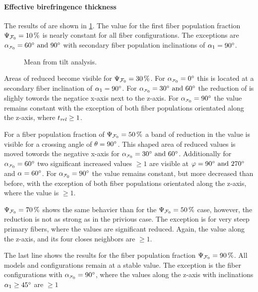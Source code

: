 \paragraph{Effective birefringence thickness \trel{}}
% 
The results of \trel{} are shown in \cref{fig:sim_ana_trel}.
The \trel{} value for the first fiber population fraction $\textnormal{$\Psi_{\textnormal{$\mathcal{F}_0$}}$}=\SI{10}{\percent}$ 
is nearly constant for all fiber configurations.
The exceptions are $\modelInc=\SIlist{60;90}{\degree}$ with secondary fiber population inclinations of $\textnormal{$\alpha$}_1 = \SI{90}{\degree}$.
\par
%
\begin{figure}[!p]
    \centering
    \tikzset{external/export next=false}
    \caption{Mean \trel{} from tilt analysis.}
    \label{fig:sim_ana_trel}
\end{figure}
% 
Areas of reduced \trel{} become visible for $\textnormal{$\Psi_{\textnormal{$\mathcal{F}_0$}}$}=\SI{30}{\percent}$.
For $\modelInc=\SI{0}{\degree}$ this is located at a secondary fiber inclination of $\textnormal{$\alpha$}_1 = \SI{90}{\degree}$.
For $\modelInc=\SIlist[]{30;60}{\degree}$ the reduction of \trel{} is slighly towords the negatice x-axis next to the z-axis.
For $\modelInc=\SI{90}{\degree}$ the \trel{} value remains constant with the exception of both fiber populations orientated along the z-axis, where $\textnormal{$t_\mathit{rel}$} \geq 1$.
\par
% 
For a fiber population fraction of $\textnormal{$\Psi_{\textnormal{$\mathcal{F}_0$}}$}=\SI{50}{\percent}$ a band of reduction in the \trel{} value is visible for a crossing angle of $\textnormal{$\theta$}=\SI{90}{\degree}$.
This  shaped area of reduced \trel{} values is moved towords the negative x-axis for $\modelInc=\SIlist{30;60}{\degree}$.
Additionally for $\modelInc=\SI{60}{\degree}$ two significant increased \trel{} values $\geq 1$ are visible at $\dir=\SIlist{90;270}{\degree}$ and $\textnormal{$\alpha$}=\SI{60}{\degree}$.
For $\modelInc=\SI{90}{\degree}$ the \trel{} value remains constant, but more decreased than before, with the exception of both fiber populations orientated along the z-axis, where the \trel{} value is $\geq 1$.
\par
% 
$\textnormal{$\Psi_{\textnormal{$\mathcal{F}_0$}}$}=\SI{70}{\percent}$ shows the same behavier than for the $\textnormal{$\Psi_{\textnormal{$\mathcal{F}_0$}}$}=\SI{50}{\percent}$ case, however, the reduction is not as strong as in the privious case.
The exception is for very steep primary fibers, where the \trel{} values are significant reduced.
Again, the \trel{} value along the z-axis, and its four closes neighbors are $\geq 1$. 
\par
% 
The last line shows the results for the fiber population fraction $\textnormal{$\Psi_{\textnormal{$\mathcal{F}_0$}}$}=\SI{90}{\percent}$.
All models and configurations remain at a stable \trel{} value.
The exception is the fiber configurations with $\modelInc=\SI{90}{\degree}$, where the \trel{} values along the z-axis with inclinations $\textnormal{$\alpha$}_1 \geq \SI{45}{\degree}$ are $\geq \SI{1}{}$
%
% 
%
